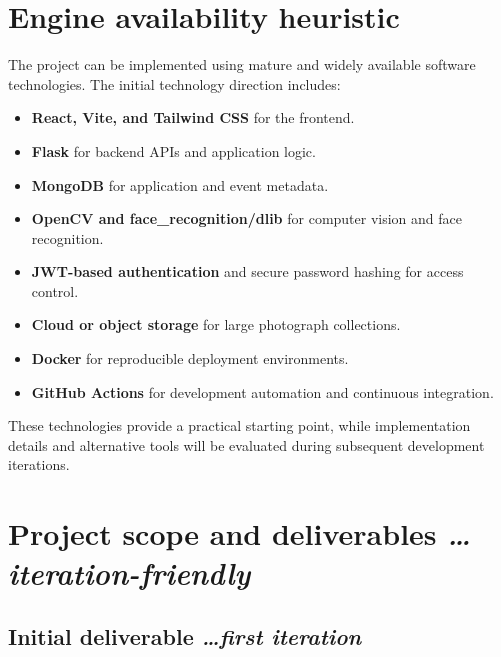 \documentclass[11pt,a4paper]{article}
\newcommand{\BvrHint}[1]{%
  {\normalfont\normalsize\itshape\hfill #1}}
\begin{document}
\section{Engine availability heuristic}

The project can be implemented using mature and widely available
software technologies. The initial technology direction includes:

\begin{itemize}[leftmargin=0.7cm]

    \item \textbf{React, Vite, and Tailwind CSS} for the frontend.

    \item \textbf{Flask} for backend APIs and application logic.

    \item \textbf{MongoDB} for application and event metadata.

    \item \textbf{OpenCV and face\_recognition/dlib} for computer
    vision and face recognition.

    \item \textbf{JWT-based authentication} and secure password
    hashing for access control.

    \item \textbf{Cloud or object storage} for large photograph
    collections.

    \item \textbf{Docker} for reproducible deployment environments.

    \item \textbf{GitHub Actions} for development automation and
    continuous integration.

\end{itemize}

These technologies provide a practical starting point, while
implementation details and alternative tools will be evaluated during
subsequent development iterations.

\section{Project scope and deliverables%
  \BvrHint{\ldots iteration-friendly}}

\subsection{Initial deliverable%
  \BvrHint{\ldots first iteration}}
\end{document}
